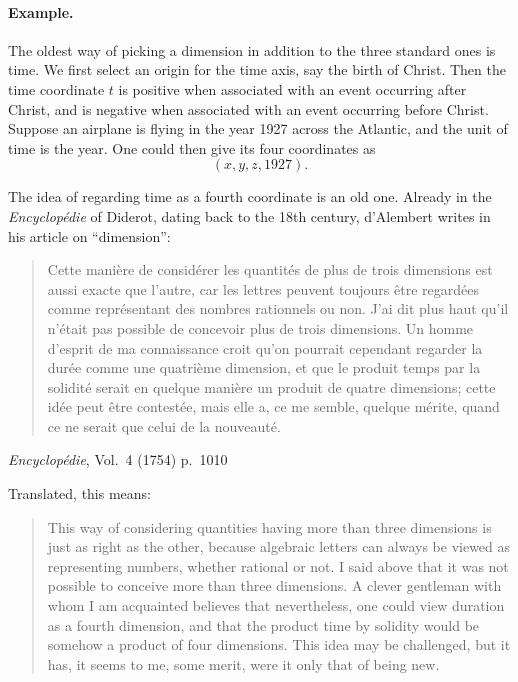 \documentclass[12pt]{book} %
\begin{document}
\paragraph{Example.}
The oldest way of picking a dimension in addition to the three standard ones is time. We first select an origin for the time axis, say the birth of Christ. Then the time coordinate $t$ is positive when associated with an event occurring after Christ, and is negative when associated with an event occurring before Christ. Suppose an airplane is flying in the year 1927 across the Atlantic, and the unit of time is the year. One could then give its four coordinates as
\[
(x,y,z,1927).
\]

The idea of regarding time as a fourth coordinate is an old one. Already in the \textit{Encyclopédie} of Diderot, dating back to the 18th century, d'Alembert writes in his article on ``dimension'':

\begin{quote}
Cette manière de considérer les quantités de plus de trois dimensions est aussi exacte que l'autre, car les lettres peuvent toujours être regardées comme représentant des nombres rationnels ou non. J'ai dit plus haut qu'il n'était pas possible de concevoir plus de trois dimensions. Un homme d'esprit de ma connaissance croit qu'on pourrait cependant regarder la durée comme une quatrième dimension, et que le produit temps par la solidité serait en quelque manière un produit de quatre dimensions; cette idée peut être contestée, mais elle a, ce me semble, quelque mérite, quand ce ne serait que celui de la nouveauté.
\end{quote}

\begin{flushright}
\textit{Encyclopédie}, Vol.\ 4 (1754) p.\ 1010
\end{flushright}

Translated, this means:

\begin{quote}
This way of considering quantities having more than three dimensions is just as right as the other, because algebraic letters can always be viewed as representing numbers, whether rational or not. I said above that it was not possible to conceive more than three dimensions. A clever gentleman with whom I am acquainted believes that nevertheless, one could view duration as a fourth dimension, and that the product time by solidity would be somehow a product of four dimensions. This idea may be challenged, but it has, it seems to me, some merit, were it only that of being new.
\end{quote}
\end{document}
